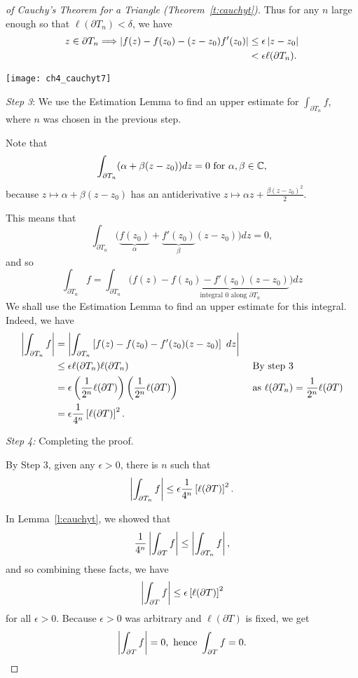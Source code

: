\begin{proof}[of Cauchy's Theorem for a Triangle (Theorem~\ref{t:cauchyt})]
Thus for any $n$ large enough so that $\ell ( \partial T_n) < \delta$, we have
\begin{align*}
z \in \partial T_n \Longrightarrow \left| f(z)-f(z_0)-(z-z_0)f'(z_0) \right| &\leq \epsilon \left| z-z_0 \right| \\
& < \epsilon \ell ( \partial T_n).
\end{align*}
\begin{center}
\texttt{[image: ch4\_cauchyt7]}
\end{center}

\emph{Step 3}: We use the Estimation Lemma to find an upper estimate for $\int_{\partial T_n} f$, where $n$ was chosen in the previous step.  

Note that
\[
\int_{\partial T_n} (\alpha+\beta(z-z_0)) dz =0 \text{ for }\alpha,\beta \in \mathbb{C},
\]
because $z \mapsto \alpha + \beta (z-z_0)$ has an antiderivative $z \mapsto \alpha z + \frac{\beta(z-z_0)^2}{2}$.


This means that
\[
\int_{\partial T_n} {\Big(} \underbrace{f(z_0)}_{\alpha}+\underbrace{f'(z_0)}_{\beta} (z-z_0) {\Big)} dz =0,
\]
and so
\[
\int_{\partial T_n} f = \int_{\partial T_n} {\Big(} f(z)-\underbrace{f(z_0)-f'(z_0)(z-z_0)}_{\text{integral }0\text{ along } \partial T_n} {\Big)} dz
\]
We shall use the Estimation Lemma to find an upper estimate for this integral.  Indeed, we have
\begin{align*}
\left| \int_{\partial T_n} f \right| & = \left| \int_{\partial T_n} \left[ f(z)-f(z_0)-f'(z_0)(z-z_0) \right]\ dz \right| &&\\
& \leq \epsilon \ell ( \partial T_n ) \ell ( \partial T_n) &&\text{ By step 3} \\
& = \epsilon \left( \frac{1}{2^n} \ell ( \partial T ) \right) \left( \frac{1}{2^n} \ell ( \partial T) \right) && \text{ as } \ell (\partial T_n) = \frac{1}{2^n} \ell ( \partial T) \\
& = \epsilon \frac{1}{4^n} \left[ \ell ( \partial T) \right]^2.
\end{align*}





\emph{Step 4:} Completing the proof.

By Step 3, given any $\epsilon>0$, there is $n$ such that
\[
\left|  \int_{\partial T_n} f  \right| \leq \epsilon \frac{1}{4^n} \left[ \ell ( \partial T) \right]^2.
\]

In Lemma~\ref{l:cauchyt}, we showed that
\[
\frac{1}{4^n} \left|  \int_{\partial T} f  \right| \leq \left|  \int_{\partial T_n} f \right|,
\]
and so combining these facts, we have
\[
\left|  \int_{\partial T} f  \right| \leq \epsilon \left[ \ell ( \partial T) \right]^2
\]
for all $\epsilon > 0$.  Because $\epsilon>0$ was arbitrary and $\ell ( \partial T)$ is fixed, we get
\[
\left|  \int_{\partial T} f  \right| = 0, \text{ hence } \int_{\partial T} f =0.
\]

\end{proof}



